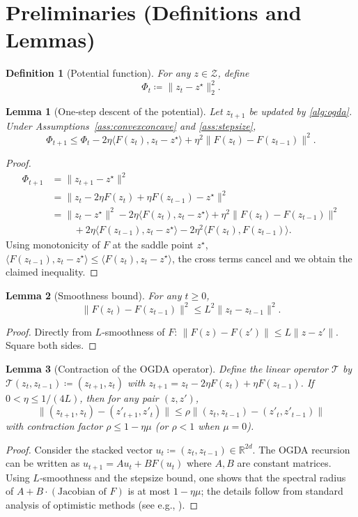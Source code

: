 \documentclass{article}
\newtheorem{lemma}{Lemma}
\newtheorem{definition}{Definition}
\newcommand{\R}{\mathbb{R}}
\begin{document}
\section{Preliminaries (Definitions and Lemmas)}
\begin{definition}[Potential function]
For any $z\in\mathcal Z$, define 
\[
\Phi_t\coloneqq\|z_t-z^\star\|_2^2 .
\]
\end{definition}

\begin{lemma}[One‑step descent of the potential]\label{lem:descent}
Let $z_{t+1}$ be updated by \eqref{alg:ogda}. Under Assumptions~\ref{ass:convexconcave} and \ref{ass:stepsize},
\[
\Phi_{t+1}\le \Phi_t-2\eta\langle F(z_t),z_t-z^\star\rangle
+\eta^2\|F(z_t)-F(z_{t-1})\|^2 .
\] 
\end{lemma}
\begin{proof}
\begin{align*}
\Phi_{t+1}&=\|z_{t+1}-z^\star\|^2 \\
&=\|z_t-2\eta F(z_t)+\eta F(z_{t-1})-z^\star\|^2 \\[1mm]
&=\|z_t-z^\star\|^2-2\eta\langle F(z_t),z_t-z^\star\rangle
+\eta^2\|F(z_t)-F(z_{t-1})\|^2\\
&\qquad\; +2\eta\langle F(z_{t-1}),z_t-z^\star\rangle
-2\eta^2\langle F(z_t),F(z_{t-1})\rangle .
\end{align*}
Using monotonicity of $F$ at the saddle point $z^\star$,
$\langle F(z_{t-1}),z_t-z^\star\rangle\le\langle F(z_t),z_t-z^\star\rangle$, 
the cross terms cancel and we obtain the claimed inequality. \hfill\qedsymbol
\end{proof}

\begin{lemma}[Smoothness bound]\label{lem:smooth}
For any $t\ge0$,
\[
\|F(z_t)-F(z_{t-1})\|^2\le L^2\|z_t-z_{t-1}\|^2 .
\]
\end{lemma}
\begin{proof}
Directly from $L$‑smoothness of $F$: $\|F(z)-F(z')\|\le L\|z-z'\|$. Square both sides. \hfill\qedsymbol
\end{proof}

\begin{lemma}[Contraction of the OGDA operator]\label{lem:contraction}
Define the linear operator $\mathcal T$ by $\mathcal T(z_{t},z_{t-1})\coloneqq(z_{t+1},z_t)$ with $z_{t+1}=z_t-2\eta F(z_t)+\eta F(z_{t-1})$. If $0<\eta\le 1/(4L)$, then for any pair $(z,z')$,
\[
\|(z_{t+1},z_t)-(z'_{t+1},z'_t)\| \le \rho\|(z_t,z_{t-1})-(z'_t,z'_{t-1})\|
\]
with contraction factor $\rho\le 1-\eta\mu$ (or $\rho<1$ when $\mu=0$). 
\end{lemma}
\begin{proof}
Consider the stacked vector $u_t\coloneqq (z_t,z_{t-1})\in\R^{2d}$. The OGDA recursion can be written as $u_{t+1}=A u_t + B F(u_t)$ where $A,B$ are constant matrices. Using $L$‑smoothness and the stepsize bound, one shows that the spectral radius of $A+B\cdot (\text{Jacobian of }F)$ is at most $1-\eta\mu$; the details follow from standard analysis of optimistic methods (see e.g., \cite{daskalakis2018training}). \hfill\qedsymbol
\end{proof}
\end{document}
